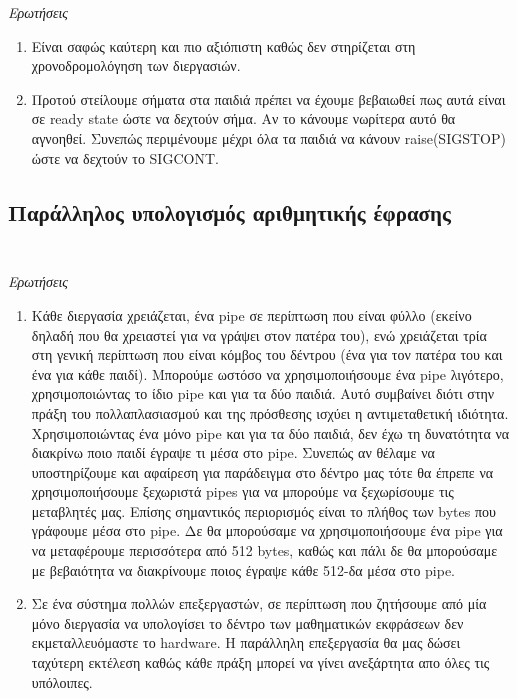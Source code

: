 \documentclass[a4paper,10pt]{article} \usepackage{anysize}
\begin{document}
\inputminted[linenos,fontsize=\footnotesize,frame=leftline]{c}{files/ask2-signals.c}
\inputminted[linenos,fontsize=\footnotesize,frame=leftline]{bash}{files/ask2-signals.out}
\emph{Ερωτήσεις}
\begin{enumerate}
\item Είναι σαφώς καύτερη και πιο αξιόπιστη καθώς δεν στηρίζεται στη
χρονοδρομολόγηση των διεργασιών.
\item Προτού στείλουμε σήματα στα παιδιά πρέπει να έχουμε βεβαιωθεί πως αυτά
είναι σε ready state ώστε να δεχτούν σήμα. Αν το κάνουμε νωρίτερα αυτό θα
αγνοηθεί. Συνεπώς περιμένουμε μέχρι όλα τα παιδιά να κάνουν raise(SIGSTOP)
ώστε να δεχτούν το SIGCONT.
\end{enumerate}

\subsection{Παράλληλος υπολογισμός αριθμητικής έφρασης}
\inputminted[linenos,fontsize=\footnotesize,frame=leftline]{c}{files/ask2-pipes.c}
\inputminted[linenos,fontsize=\footnotesize,frame=leftline]{bash}{files/ask2-pipes.out}
\emph{Ερωτήσεις}
\begin{enumerate}
\item Κάθε διεργασία χρειάζεται, ένα pipe σε περίπτωση που είναι φύλλο (εκείνο
δηλαδή που θα χρειαστεί για να γράψει στον πατέρα του), ενώ χρειάζεται τρία
στη γενική περίπτωση που είναι κόμβος του δέντρου
(ένα για τον πατέρα του και ένα για κάθε παιδί). Μπορούμε ωστόσο να
χρησιμοποιήσουμε ένα pipe λιγότερο, χρησιμοποιώντας το ίδιο pipe και για τα
δύο παιδιά. Αυτό συμβαίνει διότι στην πράξη του πολλαπλασιασμού και της πρόσθεσης
ισχύει η αντιμεταθετική ιδιότητα. Χρησιμοποιώντας ένα μόνο pipe και για τα
δύο παιδιά, δεν έχω τη δυνατότητα να διακρίνω ποιο παιδί έγραψε τι μέσα στο
pipe. Συνεπώς αν θέλαμε να υποστηρίζουμε και αφαίρεση για παράδειγμα στο δέντρο μας τότε θα
έπρεπε να χρησιμοποιήσουμε ξεχωριστά pipes για να μπορούμε να ξεχωρίσουμε τις
μεταβλητές μας. Επίσης σημαντικός περιορισμός είναι το πλήθος των bytes που
γράφουμε μέσα στο pipe. Δε θα μπορούσαμε να χρησιμοποιήσουμε ένα pipe για να
μεταφέρουμε περισσότερα από 512 bytes, καθώς και πάλι δε θα μπορούσαμε με
βεβαιότητα να διακρίνουμε ποιος έγραψε κάθε 512-δα μέσα στο pipe.
\item Σε ένα σύστημα πολλών επεξεργαστών, σε περίπτωση που ζητήσουμε από μία
μόνο διεργασία να υπολογίσει το δέντρο των μαθηματικών εκφράσεων δεν
εκμεταλλευόμαστε το hardware. Η παράλληλη επεξεργασία θα μας δώσει ταχύτερη
εκτέλεση καθώς κάθε πράξη μπορεί να γίνει ανεξάρτητα απο όλες τις υπόλοιπες.
\end{enumerate}
\end{document}
